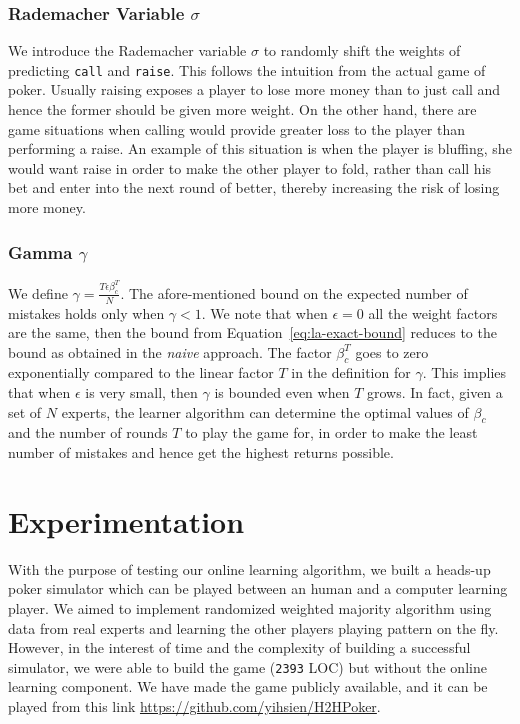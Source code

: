 \documentclass[12pt]{article}
\begin{document}
\subsubsection*{Rademacher Variable $\sigma$}
We introduce the Rademacher variable $\sigma$ to randomly shift the weights of predicting \texttt{call} and \texttt{raise}.
This follows the intuition from the actual game of poker. Usually raising exposes a player to lose more money than to just call
and hence the former should be given more weight. On the other hand, there are game situations when calling would provide greater
loss to the player than performing a raise. An example of this situation is when the player is bluffing, she would want raise in
order to make the other player to fold, rather than call his bet and enter into the next round of better, thereby increasing the risk
of losing more money.

\subsubsection*{Gamma $\gamma$}
We define $\gamma=\frac{T\epsilon\beta_c^T}{N}$. The afore-mentioned bound on the expected number of mistakes holds only when
$\gamma < 1$. We note that when $\epsilon = 0$ \ie all the weight factors are the same, then the bound from Equation~\ref{eq:la-exact-bound}
reduces to the bound as obtained in the {\em naive} approach. The factor $\beta_c^T$ goes to zero exponentially compared to the linear
factor $T$ in the definition for $\gamma$. This implies that when $\epsilon$ is very small, then $\gamma$ is bounded even when $T$ grows.
In fact, given a set of $N$ experts, the learner algorithm can determine the optimal values of $\beta_c$ and the number of rounds $T$ to play
the game for, in order to make the least number of mistakes and hence get the highest returns possible.

\section{Experimentation}
\label{sec:experimentation}
\noindent With the purpose of testing our online learning algorithm, we built a heads-up poker simulator
which can be played between an human and a computer learning player. We aimed to implement randomized weighted
majority algorithm using data from real experts and learning the other players playing pattern on the fly. However,
in the interest of time and the complexity of building a successful simulator, we were able to build the game (\texttt{2393} LOC)
but without the online learning component. We have made the game publicly available, and it can be played from this
link \url{https://github.com/yihsien/H2HPoker}.
\end{document}
